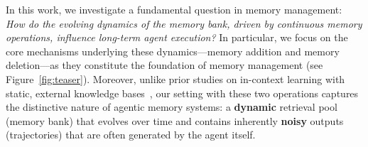 \documentclass[11pt]{article}
\theoremstyle{plain}
\theoremstyle{definition}
\newcommand{\zidi}[1]{\textcolor{purple}{[zidi:#1]}}
\newcommand{\zhen}[1]{\textcolor{blue}{[Zhen: #1]}}
\begin{document}

{
In this work, we investigate a fundamental question in memory management: \textit{How do the evolving dynamics of the memory bank, driven by continuous memory operations, influence long-term agent execution?}
In particular, we focus on the core mechanisms underlying these dynamics—memory addition and memory deletion—as they constitute the foundation of memory management (see Figure~\ref{fig:teaser}).
Moreover, unlike prior studies on in-context learning with static, external knowledge bases~\citep{luo2024context}, our setting with these two operations captures the distinctive nature of agentic memory systems: a \textbf{dynamic} retrieval pool (memory bank) that evolves over time and contains inherently \textbf{noisy} outputs (trajectories) that are often generated by the agent itself. 
}

\end{document}

